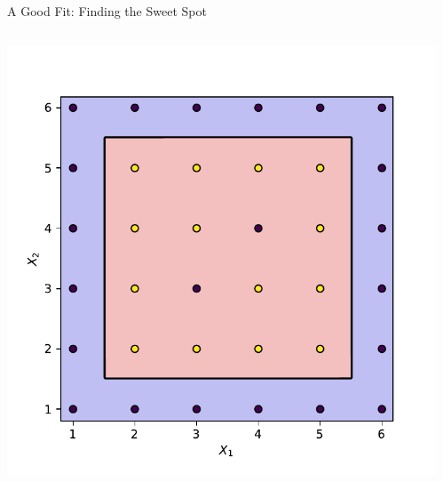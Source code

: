 \documentclass[aspectratio=169,10pt]{beamer}
\newcommand{\fitpic}[1]{\begin{adjustbox}{max width=\linewidth, max totalheight=0.78\textheight}#1\end{adjustbox}}
\begin{document}
	\begin{frame}{A Good Fit: Finding the Sweet Spot}
	\begin{columns}
		\begin{column}{0.5\textwidth}
			\fitpic{\includegraphics[width=\textwidth]{example-2-optimal-boundary}}
		\end{column}
		\begin{column}{0.5\textwidth}

\end{column}
\end{columns}
\end{frame}
\end{document}
